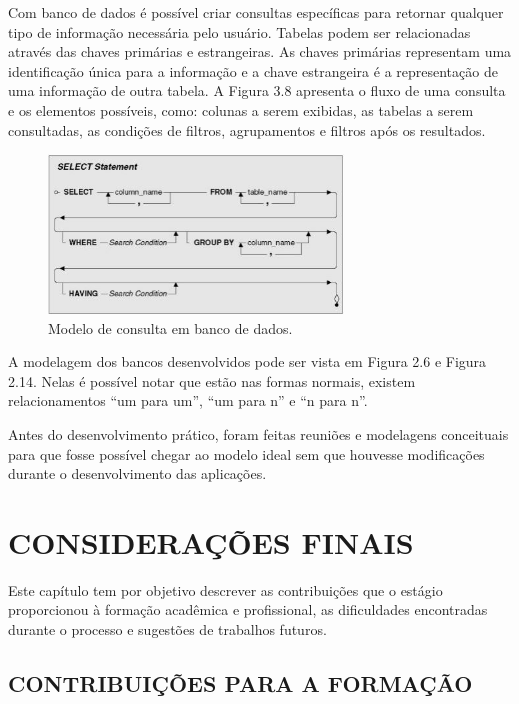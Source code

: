 \documentclass[
  12pt,				%
  openany,
  oneside,
  a4paper,			%
  english,			%
  brazil
]{article}
\numberwithin{figure}{section}
\numberwithin{table}{section}
\begin{document}
Com banco de dados é possível criar consultas específicas para retornar qualquer tipo de informação necessária pelo usuário. Tabelas podem ser relacionadas através das chaves primárias e estrangeiras. As chaves primárias representam uma identificação única para a informação e a chave estrangeira é a representação de uma informação de outra tabela. A Figura 3.8 apresenta o fluxo de uma consulta e os elementos possíveis, como: colunas a serem exibidas, as tabelas a serem consultadas, as condições de filtros, agrupamentos e filtros após os resultados.

\begin{figure}[!h]
\centering
\includegraphics[width=0.7\textwidth]{figura38}
\caption{Modelo de consulta em banco de dados.}
\end{figure}

A modelagem dos bancos desenvolvidos pode ser vista em Figura 2.6 e Figura 2.14.
Nelas é possível notar que estão nas formas normais, existem relacionamentos “um para um”,
“um para n” e “n para n”.

Antes do desenvolvimento prático, foram feitas reuniões e modelagens conceituais para que fosse possível chegar ao modelo ideal sem que houvesse modificações durante o desenvolvimento das aplicações.



\clearpage
\section{CONSIDERAÇÕES FINAIS}


Este capítulo tem por objetivo descrever as contribuições que o estágio proporcionou à formação acadêmica e profissional, as dificuldades encontradas durante o processo e sugestões de trabalhos futuros.


\subsection{CONTRIBUIÇÕES PARA A FORMAÇÃO}
\end{document}
